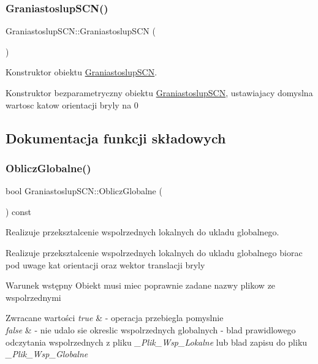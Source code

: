 \subsubsection{\texorpdfstring{Graniastoslup\+S\+C\+N()}{GraniastoslupSCN()}}
{\footnotesize\ttfamily Graniastoslup\+S\+C\+N\+::\+Graniastoslup\+S\+CN (\begin{DoxyParamCaption}{ }\end{DoxyParamCaption})}



Konstruktor obiektu \hyperlink{classGraniastoslupSCN}{Graniastoslup\+S\+CN}. 

Konstruktor bezparametryczny obiektu \hyperlink{classGraniastoslupSCN}{Graniastoslup\+S\+CN}, ustawiajacy domyslna wartosc katow orientacji bryly na 0 

\subsection{Dokumentacja funkcji składowych}
\mbox{\label{classGraniastoslupSCN_a4bf899d8eba989560c5955748c2c5204}} 
\subsubsection{\texorpdfstring{Oblicz\+Globalne()}{ObliczGlobalne()}}
{\footnotesize\ttfamily bool Graniastoslup\+S\+C\+N\+::\+Oblicz\+Globalne (\begin{DoxyParamCaption}{ }\end{DoxyParamCaption}) const}



Realizuje przeksztalcenie wspolrzednych lokalnych do ukladu globalnego. 

Realizuje przeksztalcenie wspolrzednych lokalnych do ukladu globalnego biorac pod uwage kat orientacji oraz wektor translacji bryly

\begin{DoxyPrecond}{Warunek wstępny}
Obiekt musi miec poprawnie zadane nazwy plikow ze wspolrzednymi 
\end{DoxyPrecond}

\begin{DoxyRetVals}{Zwracane wartości}
{\em true} & -\/ operacja przebiegla pomyslnie \\
\hline
{\em false} & -\/ nie udalo sie okreslic wspolrzednych globalnych -\/ blad prawidlowego odczytania wspolrzednych z pliku {\itshape \+\_\+\+Plik\+\_\+\+Wsp\+\_\+\+Lokalne} lub blad zapisu do pliku {\itshape \+\_\+\+Plik\+\_\+\+Wsp\+\_\+\+Globalne} \\
\hline
\end{DoxyRetVals}
\mbox{\label{classGraniastoslupSCN_a22fa17548fa2785b1c9850bb166fa1e7}} 
